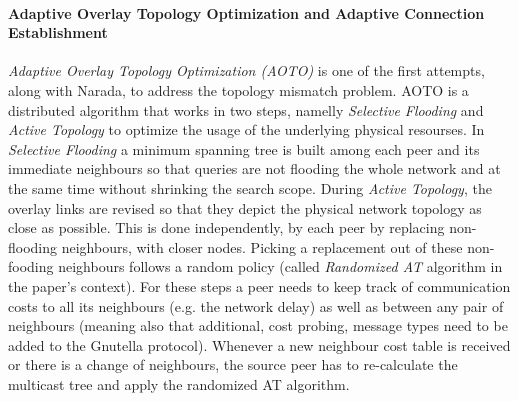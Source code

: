 \paragraph*{\bf Adaptive Overlay Topology Optimization and Adaptive Connection
Establishment}
\emph{Adaptive Overlay Topology Optimization (AOTO)} \cite{liu_aoto_2003} is one
of the first attempts, along with Narada, to address the topology mismatch
problem. AOTO is a distributed algorithm that works in two steps, namelly
\emph{Selective Flooding} and \emph{Active Topology} to optimize the usage of
the underlying physical resourses. In \emph{Selective Flooding} a minimum
spanning tree is built among each peer and its immediate neighbours so that
queries are not flooding the whole network and at the same time without
shrinking the search scope. During \emph{Active Topology}, the overlay
links are revised so that they depict the physical network topology as close as
possible. This is done independently, by each peer by replacing non-flooding
neighbours, with closer nodes. Picking a replacement out of these non-fooding
neighbours follows a random policy (called \emph{Randomized AT} algorithm in the
paper's context). For these steps a peer needs to keep track of communication
costs to all its neighbours (e.g. the network delay) as well as between any
pair of neighbours (meaning also that additional, cost probing, message types
need to be added to the Gnutella protocol). Whenever a new neighbour cost table
is received or there is a change of neighbours, the source peer has to
re-calculate the multicast tree and apply the randomized AT algorithm.

%
%
%

